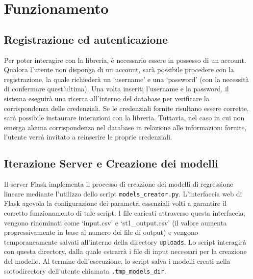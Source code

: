 \documentclass{rapportECL}
\begin{document}
\chapter{Funzionamento}
\label{cha:funzionamento}

\section{Registrazione ed autenticazione}
Per poter interagire con la libreria, è necessario essere in possesso di un account. Qualora l'utente non disponga di un account, 
sarà possibile procedere con la registrazione, la quale richiederà un `username' e una `password' (con la necessità di confermare quest'ultima). 
Una volta inseriti l'username e la password, il sistema eseguirà una ricerca all'interno del database per verificare la corrispondenza delle credenziali.
Se le credenziali fornite risultano essere corrette, sarà possibile instaurare interazioni con la libreria. 
Tuttavia, nel caso in cui non emerga alcuna corrispondenza nel database in relazione alle informazioni fornite, 
l'utente verrà invitato a reinserire le proprie credenziali. 

\section{Iterazione Server e Creazione dei modelli}

Il server Flask implementa il processo di creazione dei modelli di regressione lineare mediante l'utilizzo dello script \texttt{models\_creator.py}. 
L'interfaccia web di Flask agevola la configurazione dei parametri essenziali volti a garantire il corretto funzionamento di tale script. 
I file caricati attraverso questa interfaccia, vengono rinominati come `input.csv' e `st1\_output.csv' (il valore aumenta progressivamente in base al numero dei file di output)
e vengono temporaneamente salvati all'interno della directory \texttt{uploads}.
Lo script interagirà con questa directory, dalla quale estrarrà i file di input necessari per la creazione del modello.
Al termine dell'esecuzione, lo script salva i modelli creati nella sottodirectory dell'utente chiamata \texttt{.tmp\_models\_dir}.
\end{document}
